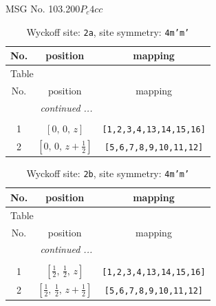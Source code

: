 \documentclass[fleqn,8pt]{jsarticle}
\begin{document}
\setcounter{MaxMatrixCols}{32}

\renewcommand{\tablename}{Table~}
\renewcommand{\figurename}{Figure~}
\begin{center}
\LARGE
MSG No. 103.200\quad$P_{c}4cc$
\end{center}
\renewcommand{\arraystretch}{1.2}
\begin{longtable}{ccc}
\caption{Wyckoff site: {\tt 2a}, site symmetry: {\tt 4m'm'}}
 \\
 \hline \hline
No. & position & mapping \\ \hline \endfirsthead

\multicolumn{2}{l}{\tablename\ \thetable{}} \\
 \hline \hline
No. & position & mapping \\ \hline \endhead

 \hline \hline
\multicolumn{2}{r}{\footnotesize\it continued ...} \\ \endfoot

 \hline \hline
\multicolumn{2}{r}{} \\ \endlastfoot

1 & $\left[ 0,\, 0,\, z \right]$ & {\tt [1,2,3,4,13,14,15,16]} \\ \hline
2 & $\left[ 0,\, 0,\, z + \frac{1}{2} \right]$ & {\tt [5,6,7,8,9,10,11,12]} \\
\end{longtable}
\renewcommand{\arraystretch}{1.2}
\begin{longtable}{ccc}
\caption{Wyckoff site: {\tt 2b}, site symmetry: {\tt 4m'm'}}
 \\
 \hline \hline
No. & position & mapping \\ \hline \endfirsthead

\multicolumn{2}{l}{\tablename\ \thetable{}} \\
 \hline \hline
No. & position & mapping \\ \hline \endhead

 \hline \hline
\multicolumn{2}{r}{\footnotesize\it continued ...} \\ \endfoot

 \hline \hline
\multicolumn{2}{r}{} \\ \endlastfoot

1 & $\left[ \frac{1}{2},\, \frac{1}{2},\, z \right]$ & {\tt [1,2,3,4,13,14,15,16]} \\ \hline
2 & $\left[ \frac{1}{2},\, \frac{1}{2},\, z + \frac{1}{2} \right]$ & {\tt [5,6,7,8,9,10,11,12]} \\
\end{longtable}
\end{document}
